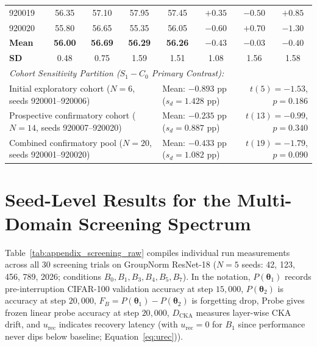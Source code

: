 \documentclass[sn-mathphys,Numbered]{sn-jnl}
\newcommand{\Dcka}{D_{\mathrm{CKA}}}
\newcommand{\vtheta}{\bm{\theta}}
\newcommand{\urec}{u_{\mathrm{rec}}}
\begin{document}
\begin{appendices}
\begin{table}[t]
{\begin{tabular}{lccccccc}
920019 & 56.35 & 57.10 & 57.95 & 57.45 & $+0.35$ & $-0.50$ & $+0.85$ \\
920020 & 55.80 & 56.65 & 55.35 & 56.05 & $-0.60$ & $+0.70$ & $-1.30$ \\
\midrule
\textbf{Mean} & \textbf{56.00} & \textbf{56.69} & \textbf{56.29} & \textbf{56.26} & $\bm{-0.43}$ & $\bm{-0.03}$ & $\bm{-0.40}$ \\
\textbf{SD}   & 0.48  & 0.75  & 1.59  & 1.51  & 1.08  & 1.56  & 1.58 \\
\midrule
\multicolumn{8}{l}{\textit{Cohort Sensitivity Partition ($S_1 - C_0$ Primary Contrast):}} \\
\multicolumn{4}{l}{Initial exploratory cohort ($N = 6$, seeds 920001--920006)} & \multicolumn{2}{l}{Mean: $-0.893$ pp ($s_d = 1.428$ pp)} & \multicolumn{2}{r}{$t(5) = -1.53$, $p = 0.186$} \\
\multicolumn{4}{l}{Prospective confirmatory cohort ($N = 14$, seeds 920007--920020)} & \multicolumn{2}{l}{Mean: $-0.235$ pp ($s_d = 0.887$ pp)} & \multicolumn{2}{r}{$t(13) = -0.99$, $p = 0.340$} \\
\multicolumn{4}{l}{Combined confirmatory pool ($N = 20$, seeds 920001--920020)} & \multicolumn{2}{l}{Mean: $-0.433$ pp ($s_d = 1.082$ pp)} & \multicolumn{2}{r}{$t(19) = -1.79$, $p = 0.090$} \\
\bottomrule
\end{tabular}%
}
\end{table}

\section{Seed-Level Results for the Multi-Domain Screening Spectrum}\label{sec:appendix_screening}

Table~\ref{tab:appendix_screening_raw} compiles individual run measurements across all 30 screening trials on GroupNorm ResNet-18 ($N = 5$ seeds: 42, 123, 456, 789, 2026; conditions $B_0, B_1, B_3, B_4, B_5, B_7$). In the notation, $P(\vtheta_1)$ records pre-interruption CIFAR-100 validation accuracy at step $15{,}000$, $P(\vtheta_2)$ is accuracy at step $20{,}000$, $F_B = P(\vtheta_1) - P(\vtheta_2)$ is forgetting drop, $\mathrm{Probe}$ gives frozen linear probe accuracy at step $20{,}000$, $\Dcka$ measures layer-wise CKA drift, and $\urec$ indicates recovery latency (with $\urec = 0$ for $B_1$ since performance never dips below baseline; Equation~\ref{eq:urec})).


\end{appendices}
\end{document}
